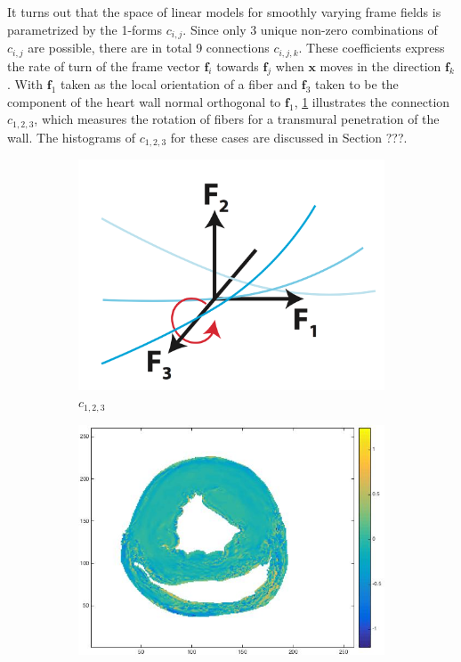 It turns out that the space of linear models for smoothly varying frame fields is parametrized by the 1-forms $c_{i,j}$. Since only 3 unique non-zero combinations of $c_{i,j}$ are possible, there are in total 9 connections $c_{i,j,k}$. These coefficients express the rate of turn of the frame vector $\mathbf{f}_i$ towards $\mathbf{f}_j$ when $\mathbf{x}$ moves in the direction $\mathbf{f}_k$. With $\mathbf{f}_1$ taken as the local orientation of a fiber and $\mathbf{f}_3$ taken to be the component of the heart wall normal orthogonal to $\mathbf{f}_1$, \ref{fig:c123theory} illustrates the connection $c_{1,2,3}$, which measures the rotation of fibers for a transmural penetration of the wall. The histograms of $c_{1,2,3}$ for these cases are discussed in Section ???. \\
\begin{figure}[h!]
    \centering
    \begin{subfigure}[h!]{0.3\textwidth}
        \centering
        \includegraphics[width=\textwidth]{figures/c123}
        \caption{$c_{1,2,3}$}
        \label{fig:c123theory}
    \end{subfigure}
    \hfill
    \begin{subfigure}[h!]{0.3\textwidth}
        \centering
        \includegraphics[width=\textwidth]{figures/pig4_c123_slice_19}

\end{subfigure}
\end{figure}
